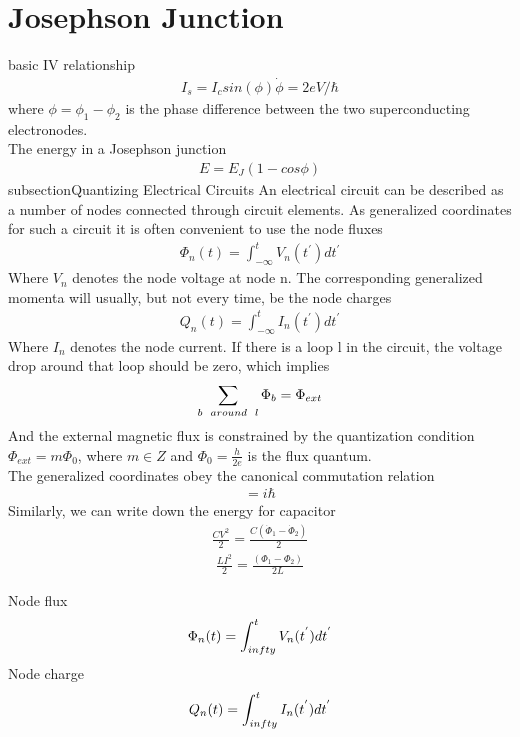 \documentclass[a4paper]{article}
\begin{document}
\section{Josephson Junction}
basic IV relationship
\begin{align*}
	I_s = I_c sin(\phi)
	\dot \phi = 2eV/\hbar
\end{align*}
where $\phi = \phi_1 - \phi_2$ is the phase difference between the two superconducting electronodes.\\
The energy in a Josephson junction\\
\begin{align*}
        E = E_J(1 - cos \phi)
\end{align*}
subsection{Quantizing Electrical Circuits}
An electrical circuit can be described as a number of nodes connected through circuit elements. As generalized coordinates for such a circuit it is often convenient to use the node fluxes
\begin{align*}
        \Phi_n(t) = \int_{-\infty}^{t} V_n(t^{'})dt^'
\end{align*}
Where $V_n$ denotes the node voltage at node n. The corresponding generalized momenta will usually, but not every time, be the node charges
\begin{align*}
        Q_n(t) = \int_{-\infty}^t I_n(t^{'}) dt^'
\end{align*}
Where $I_n$ denotes the node current. If there is a loop l in the circuit, the voltage drop around that loop should be zero, which implies
\begin{align*}
        \sum_{b\hspace{2mm} around \hspace{2mm} l} \Phi_b = \Phi_{ext}
\end{align*}
And the external magnetic flux is constrained by the quantization condition $\Phi_{ext} = m \Phi_0$, where $m\in Z$ and $\Phi_0 = \frac{h}{2e}$ is the flux quantum.\\
The generalized coordinates obey the canonical commutation relation
\begin{align*}
        [\Phi, Q] = i \hbar
\end{align*}
Similarly, we can write down the energy for capacitor
\begin{align*}
        \frac{CV^2}{2} = \frac{C( \dot{\Phi}_1- \dot{\Phi}_2)}{2}
\end{align*}
\begin{align*}
        \frac{LI^2}{2} = \frac{( \Phi_1- \Phi_2)}{2L}
\end{align*}

Node flux\\
\begin{align*}
	\Phi_n(t) = \int^t_{\-infty} V_n(t^{'}) dt^{'}
\end{align*}
Node charge\\
\begin{align*}
	Q_n(t) = \int^t_{\-infty} I_n(t^{'}) dt^{'}
\end{align*}
\end{document}

